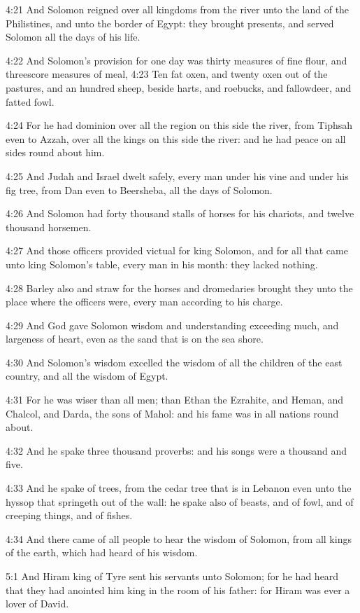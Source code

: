 4:21 And Solomon reigned over all kingdoms from the river unto the
land of the Philistines, and unto the border of Egypt: they brought
presents, and served Solomon all the days of his life.

4:22 And Solomon's provision for one day was thirty measures of fine
flour, and threescore measures of meal, 4:23 Ten fat oxen, and twenty
oxen out of the pastures, and an hundred sheep, beside harts, and
roebucks, and fallowdeer, and fatted fowl.

4:24 For he had dominion over all the region on this side the river,
from Tiphsah even to Azzah, over all the kings on this side the river:
and he had peace on all sides round about him.

4:25 And Judah and Israel dwelt safely, every man under his vine and
under his fig tree, from Dan even to Beersheba, all the days of
Solomon.

4:26 And Solomon had forty thousand stalls of horses for his chariots,
and twelve thousand horsemen.

4:27 And those officers provided victual for king Solomon, and for all
that came unto king Solomon's table, every man in his month: they
lacked nothing.

4:28 Barley also and straw for the horses and dromedaries brought they
unto the place where the officers were, every man according to his
charge.

4:29 And God gave Solomon wisdom and understanding exceeding much, and
largeness of heart, even as the sand that is on the sea shore.

4:30 And Solomon's wisdom excelled the wisdom of all the children of
the east country, and all the wisdom of Egypt.

4:31 For he was wiser than all men; than Ethan the Ezrahite, and
Heman, and Chalcol, and Darda, the sons of Mahol: and his fame was in
all nations round about.

4:32 And he spake three thousand proverbs: and his songs were a
thousand and five.

4:33 And he spake of trees, from the cedar tree that is in Lebanon
even unto the hyssop that springeth out of the wall: he spake also of
beasts, and of fowl, and of creeping things, and of fishes.

4:34 And there came of all people to hear the wisdom of Solomon, from
all kings of the earth, which had heard of his wisdom.

5:1 And Hiram king of Tyre sent his servants unto Solomon; for he had
heard that they had anointed him king in the room of his father: for
Hiram was ever a lover of David.

